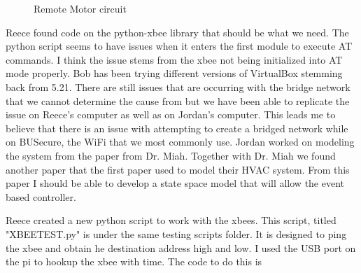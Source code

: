 \documentclass[fontsize=11pt, %
                             paper=letter, %
                             twoside, %
                             captions=tableheading,
                             index=totoc,
                             hyperref]{labbook}
\begin{document}
\begin{figure}
  
  \caption{Remote Motor circuit}
  \label{fig:Remote Motor Circuit}
\end{figure}



Reece found code on the python-xbee library that should be what we need. The python script seems to have issues when it enters the first module to execute AT commands. I think the issue stems from the xbee not being initialized into AT mode properly. 
Bob has been trying different versions of VirtualBox stemming back from 5.21. There are still issues that are occurring with the bridge network that we cannot determine the cause from but we have been able to replicate the issue on Reece's computer as well as on Jordan's computer. This leads me to believe that there is an issue with attempting to create a bridged network while on BUSecure, the WiFi that we most commonly use. 
Jordan worked on modeling the system from the paper from Dr. Miah. Together with Dr. Miah we found another paper that the first paper used to model their HVAC system. From this paper I should be able to develop a state space model that will allow the event based controller.


Reece created a new python script to work with the xbees. This script, titled "XBEETEST.py" is under the same testing scripts folder. It is designed to ping the xbee and obtain he destination address high and low. I used the USB port on the pi to hookup the xbee with time. The code to do this is 
\end{document}
